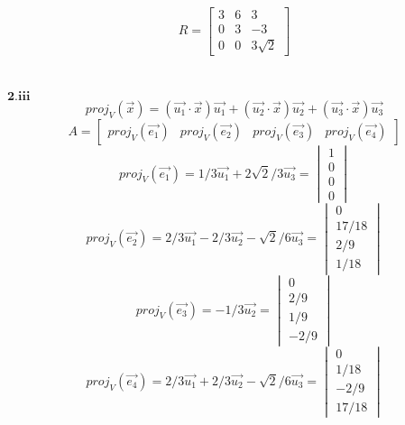 \documentclass[letterpaper,12pt]{article}
\begin{document}
\begin{equation*}
R =
\begin{bmatrix}
3 & 6 & 3 \\
0 & 3 & -3 \\
0 & 0 & 3 \sqrt{2}
\end{bmatrix}
\end{equation*}
\\
\\$\mathbf{2.iii}$
\begin{equation*}
proj_V(\vec{x}) = (\vec{u_1} \cdot \vec{x}) \vec{u_1} +  (\vec{u_2} \cdot \vec{x}) \vec{u_2} +  (\vec{u_3} \cdot \vec{x}) \vec{u_3}
\end{equation*}
\begin{equation*}
A = 
\begin{bmatrix}
proj_V(\vec{e_1}) & 
proj_V(\vec{e_2}) & 
proj_V(\vec{e_3}) & 
proj_V(\vec{e_4})
\end{bmatrix}
\end{equation*}
\begin{equation*}
proj_V(\vec{e_1})  =
1/3 \vec{u_1} + 2 \sqrt{2} / 3 \vec{u_3} =
\begin{vmatrix}
1 \\
0 \\
0 \\
0
\end{vmatrix}
\end{equation*}
\begin{equation*}
proj_V(\vec{e_2})  =
2/3 \vec{u_1} - 2/3 \vec{u_2} - \sqrt{2}/6 \vec{u_3} =
\begin{vmatrix}
0 \\
17 / 18 \\
2 / 9 \\
1 / 18
\end{vmatrix}
\end{equation*}
\begin{equation*}
proj_V(\vec{e_3})  =
-1/3 \vec{u_2} =
\begin{vmatrix}
0 \\
2/9 \\
1/9 \\
-2/9
\end{vmatrix}
\end{equation*}
\begin{equation*}
proj_V(\vec{e_4})  =
2/3 \vec{u_1} + 2/3 \vec{u_2} - \sqrt{2}/6 \vec{u_3} =
\begin{vmatrix}
0 \\
1/18 \\
-2/9 \\
17/18
\end{vmatrix}
\end{equation*}
\end{document}
